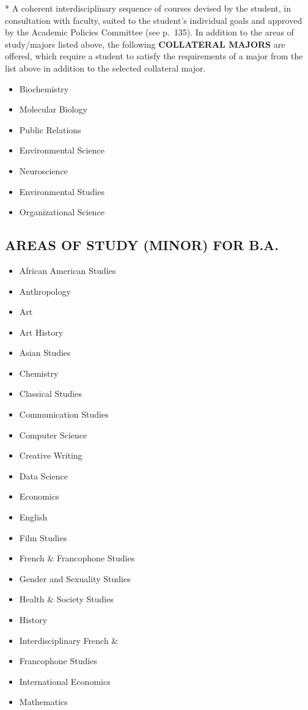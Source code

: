 \documentclass[
  letterpaper,
]{scrbook}
\providecommand{\tightlist}{%
  \setlength{\itemsep}{0pt}\setlength{\parskip}{0pt}}
\begin{document}
* A coherent interdisciplinary sequence of courses devised by the
student, in consultation with faculty, suited to the student's
individual goals and approved by the Academic Policies Committee (see
p.~135). In addition to the areas of study/majors listed above, the
following \textbf{COLLATERAL MAJORS} are offered, which require a
student to satisfy the requirements of a major from the list above in
addition to the selected collateral major.

\begin{itemize}
\tightlist
\item
  Biochemistry
\item
  Molecular Biology
\item
  Public Relations
\item
  Environmental Science
\item
  Neuroscience
\item
  Environmental Studies
\item
  Organizational Science
\end{itemize}

\subsection{AREAS OF STUDY (MINOR) FOR
B.A.}\label{areas-of-study-minor-for-b.a.}

\begin{itemize}
\tightlist
\item
  African American Studies
\item
  Anthropology
\item
  Art
\item
  Art History
\item
  Asian Studies
\item
  Chemistry
\item
  Classical Studies
\item
  Communication Studies
\item
  Computer Science
\item
  Creative Writing
\item
  Data Science
\item
  Economics
\item
  English
\item
  Film Studies
\item
  French \& Francophone Studies
\item
  Gender and Sexuality Studies
\item
  Health \& Society Studies
\item
  History
\item
  Interdisciplinary French \&
\item
  Francophone Studies
\item
  International Economics
\item
  Mathematics
\end{itemize}
\end{document}
